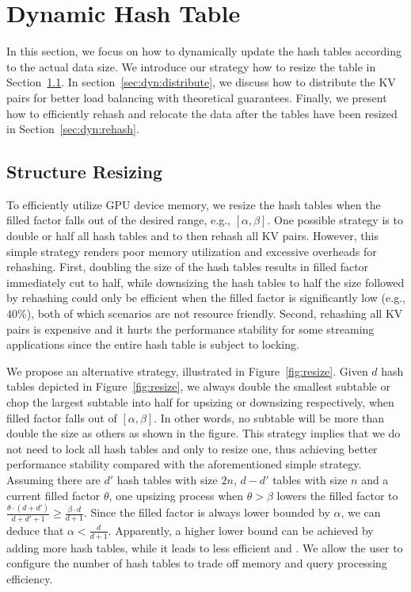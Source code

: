 \section{Dynamic Hash Table}\label{sec:dyn}


In this section, we focus on how to dynamically update the hash tables according to the actual data size. 
We introduce our strategy how to resize the table in Section~\ref{sec:dyn:resize}.
In section~\ref{sec:dyn:distribute}, we discuss how to distribute the KV pairs for better load balancing with theoretical guarantees. 
Finally, we present how to efficiently rehash and relocate the data after the tables have been resized in Section~\ref{sec:dyn:rehash}. 

\subsection{Structure Resizing}\label{sec:dyn:resize}
To efficiently utilize GPU device memory, we resize the hash tables when the filled factor falls out of the desired range, e.g., $[\alpha,\beta]$.
One possible strategy is to double or half all hash tables and to then rehash all KV pairs. However, this simple strategy renders poor memory utilization and 
excessive overheads for rehashing. First, doubling the size of the hash tables results in filled factor immediately cut to half, while downsizing the hash tables to half the size followed by rehashing could only be efficient when the filled factor is significantly low (e.g., $40\%$), both of which scenarios are not resource friendly. Second, rehashing all KV pairs is expensive and it hurts the performance stability for some streaming applications since the entire hash table is subject to locking. 

We propose an alternative strategy, illustrated in Figure~\ref{fig:resize}. 
Given $d$ hash tables depicted in Figure~\ref{fig:resize},
we always double the smallest subtable or chop the largest subtable into half for upsizing or downsizing respectively, when filled factor falls out of $[\alpha,\beta]$. 
In other words, no subtable will be more than double the size as others as shown in the figure. This strategy implies that we do not need to lock all hash tables and only to resize one, thus achieving better performance stability compared with the aforementioned simple strategy. 
Assuming there are $d'$ hash tables with size $2n$, $d-d'$ tables with size $n$ and a current filled factor $\theta$, 
one upsizing process when $\theta > \beta$ lowers the filled factor to $\frac{\theta\cdot(d+d')}{d+d'+1} \geq \frac{\beta \cdot d}{d+1}$.  
Since the filled factor is always lower bounded by $\alpha$, we can deduce that $\alpha < \frac{d}{d+1}$.
Apparently, a higher lower bound can be achieved by adding more hash tables, while it leads to less efficient  and . 
We allow the user to configure the number of hash tables to trade off memory and query processing efficiency. 

